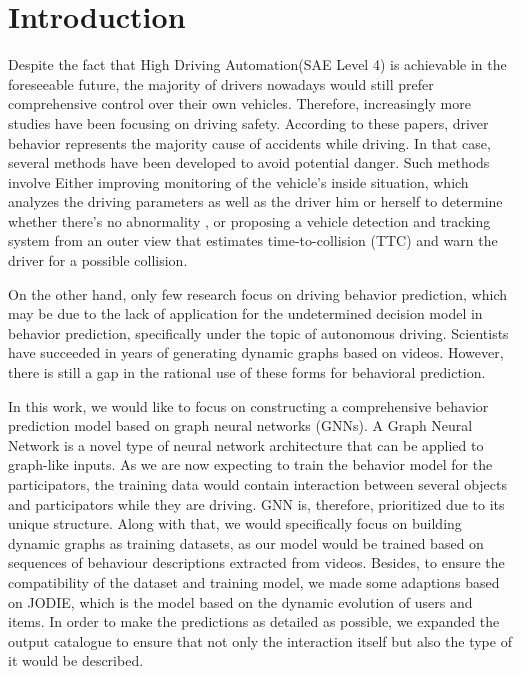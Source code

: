 
\chapter{Introduction}\label{chapter:introduction}
Despite the fact that High Driving Automation(SAE Level 4) is achievable in the foreseeable future\cite{inagaki2019critique}, the majority of drivers nowadays would still prefer comprehensive control over their own vehicles. Therefore, increasingly more studies have been focusing on driving safety\cite{lee2005driving}\cite{lee2008fifty}. 
According to these papers, driver behavior represents the majority cause of accidents while driving. In that case, several methods have been developed to avoid potential danger. Such methods involve Either improving monitoring of the vehicle's inside situation, which analyzes the driving parameters as well as the driver him or herself to determine whether there's no abnormality \cite{karrouchi2023driving}, or proposing a vehicle detection and tracking system from an outer view that estimates time-to-collision (TTC) and warn the driver for a possible collision\cite{aytekin2010increasing}.

On the other hand, only few research focus on driving behavior prediction, which may be due to the lack of application for the undetermined decision model in behavior prediction, specifically under the topic of autonomous driving. Scientists have succeeded in years of generating dynamic graphs based on videos. However, there is still a gap in the rational use of these forms for behavioral prediction.

In this work, we would like to focus on constructing a comprehensive behavior prediction model based on graph neural networks (GNNs). A Graph Neural Network is a novel type of neural network architecture that can be applied to graph-like inputs. As we are now expecting to train the behavior model for the participators, the training data would contain interaction between several objects and participators while they are driving. GNN is, therefore, prioritized due to its unique structure. Along with that, we would specifically focus on building dynamic graphs as training datasets, as our model would be trained based on sequences of behaviour descriptions extracted from videos.
Besides, to ensure the compatibility of the dataset and training model, we made some adaptions based on JODIE\cite{kumar2019predicting}, which is the model based on the dynamic evolution of users and items. In order to make the predictions as detailed as possible, we expanded the output catalogue to ensure that not only the interaction itself but also the type of it would be described.

